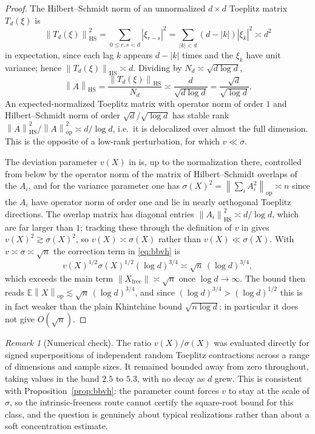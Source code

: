 \documentclass[11pt]{amsart}
\numberwithin{equation}{section}
\theoremstyle{definition}
\theoremstyle{remark}
\newtheorem{remark}[theorem]{Remark}
\newcommand{\op}{\mathrm{op}}
\newcommand{\HS}{\mathrm{HS}}
\newcommand{\Exp}{\mathbb E}
\newcommand{\norm}[1]{\left\lVert #1\right\rVert}
\newcommand{\abs}[1]{\left\lvert #1\right\rvert}
\begin{document}
\begin{proof}
The Hilbert--Schmidt norm of an unnormalized $d\times d$ Toeplitz matrix
$T_d(\xi)$ is
\[
\norm{T_d(\xi)}_{\HS}^2=\sum_{0\le r,s<d}\abs{\xi_{r-s}}^2
=\sum_{\abs k<d}(d-\abs k)\abs{\xi_k}^2\asymp d^2
\]
in expectation, since each lag $k$ appears $d-\abs k$ times and the $\xi_k$ have
unit variance; hence $\norm{T_d(\xi)}_{\HS}\asymp d$. Dividing by
$N_d\asymp\sqrt{d\log d}$,
\[
\norm{A}_{\HS}=\frac{\norm{T_d(\xi)}_{\HS}}{N_d}\asymp\frac{d}{\sqrt{d\log d}}
=\frac{\sqrt d}{\sqrt{\log d}}.
\]
An expected-normalized Toeplitz matrix with operator norm of order $1$ and Hilbert--Schmidt norm of order
$\sqrt d/\sqrt{\log d}$ has stable rank $\norm{A}_{\HS}^2/\norm{A}_{\op}^2\asymp
d/\log d$, i.e.\ it is delocalized over almost the full dimension. This is the
opposite of a low-rank perturbation, for which $v\ll\sigma$.

The deviation parameter $v(X)$ in \cite{BBvH} is, up to the normalization there,
controlled from below by the operator norm of the matrix of Hilbert--Schmidt
overlaps of the $A_i$, and for the variance parameter one has
$\sigma(X)^2=\norm{\sum_iA_i^2}_{\op}\asymp n$ since the \(A_i\) have operator
norm of order one and lie in nearly orthogonal Toeplitz directions. The overlap matrix has diagonal entries
$\norm{A_i}_{\HS}^2\asymp d/\log d$, which are far larger than $1$; tracking these
through the definition of $v$ in \cite{BBvH} gives $v(X)^2\gtrsim
\sigma(X)^2$, so $v(X)\asymp\sigma(X)$ rather than $v(X)\ll\sigma(X)$. With
$v\asymp\sigma\asymp\sqrt n$ the correction term in \eqref{eq:bbvh} is
\[
v(X)^{1/2}\sigma(X)^{1/2}(\log d)^{3/4}\asymp\sqrt n\,(\log d)^{3/4},
\]
which exceeds the main term $\norm{X_{\mathrm{free}}}\asymp\sqrt n$ once
$\log d\to\infty$. The bound then reads
$\Exp\norm{X}_{\op}\lesssim\sqrt n\,(\log d)^{3/4}$, and since
$(\log d)^{3/4}>(\log d)^{1/2}$ this is in fact weaker than the plain Khintchine
bound $\sqrt{n\log d}$; in particular it does not give $O(\sqrt n)$.
\end{proof}

\begin{remark}[Numerical check]
The ratio $v(X)/\sigma(X)$ was evaluated directly for signed superpositions of
independent random Toeplitz contractions across a range of dimensions and
sample sizes. It remained bounded away from zero throughout, taking values in the
band $2.5$ to $5.3$, with no decay as $d$ grew. This is consistent with
Proposition~\ref{prop:bbvh}: the parameter count forces $v$ to stay at the scale
of $\sigma$, so the intrinsic-freeness route cannot certify the square-root bound
for this class, and the question is genuinely about typical realizations rather
than about a soft concentration estimate.
\end{remark}
\end{document}

